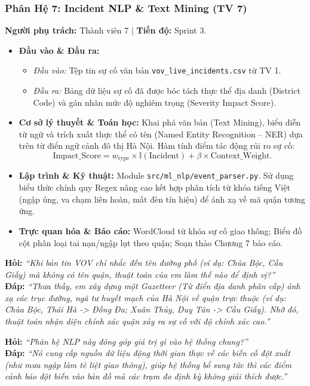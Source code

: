 \documentclass[11pt,a4paper]{article}
\begin{document}
\subsubsection{Phân Hệ 7: Incident NLP \& Text Mining (TV 7)}
\textbf{Người phụ trách:} Thành viên 7 \quad $\vert$ \quad \textbf{Tiến độ:} Sprint 3.
\begin{itemize}[leftmargin=*]
    \item \textbf{Đầu vào \& Đầu ra:}
    \begin{itemize}
        \item \textit{Đầu vào:} Tệp tin sự cố văn bản \texttt{vov\_live\_incidents.csv} từ TV 1.
        \item \textit{Đầu ra:} Bảng dữ liệu sự cố đã được bóc tách thực thể địa danh (District Code) và gán nhãn mức độ nghiêm trọng (Severity Impact Score).
    \end{itemize}
    \item \textbf{Cơ sở lý thuyết \& Toán học:}
    Khai phá văn bản (Text Mining), biểu diễn từ ngữ và trích xuất thực thể có tên (Named Entity Recognition -- NER) dựa trên từ điển ngữ cảnh đô thị Hà Nội. Hàm tính điểm tác động rủi ro sự cố:
    \begin{equation}
        \text{Impact\_Score} = w_{\text{type}} \times \mathbb{I}(\text{Incident}) + \beta \times \text{Context\_Weight}.
    \end{equation}
    \item \textbf{Lập trình \& Kỹ thuật:} Module \texttt{src/ml\_nlp/event\_parser.py}. Sử dụng biểu thức chính quy Regex nâng cao kết hợp phân tích từ khóa tiếng Việt (ngập úng, va chạm liên hoàn, mất đèn tín hiệu) để ánh xạ về mã quận tương ứng.
    \item \textbf{Trực quan hóa \& Báo cáo:} WordCloud từ khóa sự cố giao thông; Biểu đồ cột phân loại tai nạn/ngập lụt theo quận; Soạn thảo Chương 7 báo cáo.
\end{itemize}

\begin{tcolorbox}[colback=blue!5!white, colframe=blue!60!black, fonttitle=\bfseries\color{white}, title={BỘ CÂU HỎI VẤN ĐÁP TRỌNG TÂM DÀNH CHO TV 7}]
\textbf{Hỏi:} \textit{“Khi bản tin VOV chỉ nhắc đến tên đường phố (ví dụ: Chùa Bộc, Cầu Giấy) mà không có tên quận, thuật toán của em làm thế nào để định vị?”}\\
\textbf{Đáp:} \textit{“Thưa thầy, em xây dựng một Gazetteer (Từ điển địa danh phân cấp) ánh xạ các trục đường, ngã tư huyết mạch của Hà Nội về quận trực thuộc (ví dụ: Chùa Bộc, Thái Hà -> Đống Đa; Xuân Thủy, Duy Tân -> Cầu Giấy). Nhờ đó, thuật toán nhận diện chính xác quận xảy ra sự cố với độ chính xác cao.”}

\textbf{Hỏi:} \textit{“Phân hệ NLP này đóng góp giá trị gì vào hệ thống chung?”}\\
\textbf{Đáp:} \textit{“Nó cung cấp nguồn dữ liệu động thời gian thực về các biến cố đột xuất (như mưa ngập làm tê liệt giao thông), giúp hệ thống bổ sung tức thì các điểm cảnh báo đột biến vào bản đồ mà các trạm đo định kỳ không giải thích được.”}
\end{tcolorbox}
\end{document}
